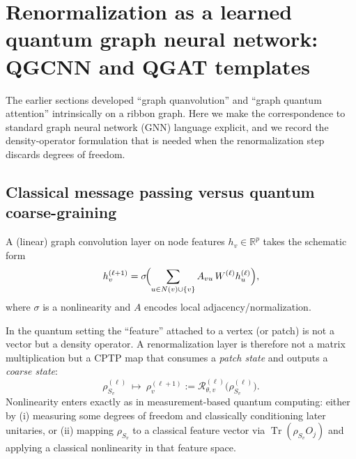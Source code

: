 \documentclass[11pt,oneside]{amsbook}
\numberwithin{equation}{section}
\theoremstyle{plain}
\theoremstyle{definition}
\theoremstyle{remark}
\DeclareMathOperator{\Tr}{\mathrm{Tr}}
\begin{document}


\section{Renormalization as a learned quantum graph neural network: QGCNN and QGAT templates}
\label{sec:renorm_qgnn_templates}

The earlier sections developed ``graph quanvolution'' and ``graph quantum attention'' intrinsically on a ribbon graph.
Here we make the correspondence to standard graph neural network (GNN) language explicit, and we record the density-operator formulation that is needed when the renormalization step discards degrees of freedom.

\subsection{Classical message passing versus quantum coarse-graining}
A (linear) graph convolution layer on node features $h_v\in\mathbb{R}^p$ takes the schematic form
\[
h_v^{(\ell+1)}=\sigma\!\Bigl(\sum_{u\in N(v)\cup\{v\}} A_{vu}\,W^{(\ell)} h_u^{(\ell)}\Bigr),
\]
where $\sigma$ is a nonlinearity and $A$ encodes local adjacency/normalization.

In the quantum setting the ``feature'' attached to a vertex (or patch) is not a vector but a density operator.
A renormalization layer is therefore not a matrix multiplication but a CPTP map that consumes a \emph{patch state} and outputs a \emph{coarse state}:
\[
\rho_{S_v}^{(\ell)} \ \longmapsto\ \rho_{v}^{(\ell+1)}
:=\mathcal{R}_{\theta,v}^{(\ell)}\big(\rho_{S_v}^{(\ell)}\big).
\]
Nonlinearity enters exactly as in measurement-based quantum computing:
either by (i) measuring some degrees of freedom and classically conditioning later unitaries, or (ii) mapping $\rho_{S_v}$ to a classical feature vector via $\Tr(\rho_{S_v}O_j)$ and applying a classical nonlinearity in that feature space.
\end{document}

